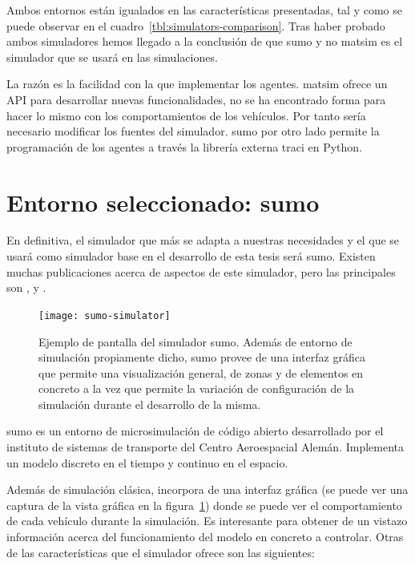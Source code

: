 Ambos entornos están igualados en las características presentadas, tal y como se puede observar en el cuadro~\ref{tbl:simulators-comparison}. Tras haber probado ambos simuladores hemos llegado a la conclusión de que \ac{sumo} y no \ac{matsim} es el simulador que se usará en las simulaciones.

La razón es la facilidad con la que implementar los agentes. \ac{matsim} ofrece un API para desarrollar nuevas funcionalidades, no se ha encontrado forma para hacer lo mismo con los comportamientos de los vehículos. Por tanto sería necesario modificar los fuentes del simulador. \ac{sumo} por otro lado permite la programación de los agentes a través la librería externa \ac{traci} en Python.

\section{Entorno seleccionado: \gls{sumo}}

En definitiva, el simulador que más se adapta a nuestras necesidades y el que se usará como simulador base en el desarrollo de esta tesis será \gls{sumo}. Existen muchas publicaciones acerca de aspectos de este simulador, pero las principales son \cite{krajzewicz2002sumo}, \cite{behrisch2011sumo} y \cite{krajzewicz2012recent}.

\begin{figure}
	\texttt{[image: sumo-simulator]}
	\caption{Ejemplo de pantalla del simulador \gls{sumo}. Además de entorno de simulación propiamente dicho, \gls{sumo} provee de una interfaz gráfica que permite una visualización general, de zonas y de elementos en concreto a la vez que permite la variación de configuración de la simulación durante el desarrollo de la misma.}
	\label{fig:sumo-simulator}
\end{figure}

\gls{sumo} es un entorno de microsimulación de código abierto desarrollado por el instituto de sistemas de transporte del Centro Aeroespacial Alemán. Implementa un modelo discreto en el tiempo y continuo en el espacio.

Además de simulación clásica, incorpora de una interfaz gráfica (se puede ver una captura de la vista gráfica en la figura~\ref{fig:sumo-simulator}) donde se puede ver el comportamiento de cada vehículo durante la simulación. Es interesante para obtener de un vistazo información acerca del funcionamiento del modelo en concreto a controlar. Otras de las características que el simulador ofrece son las siguientes:

